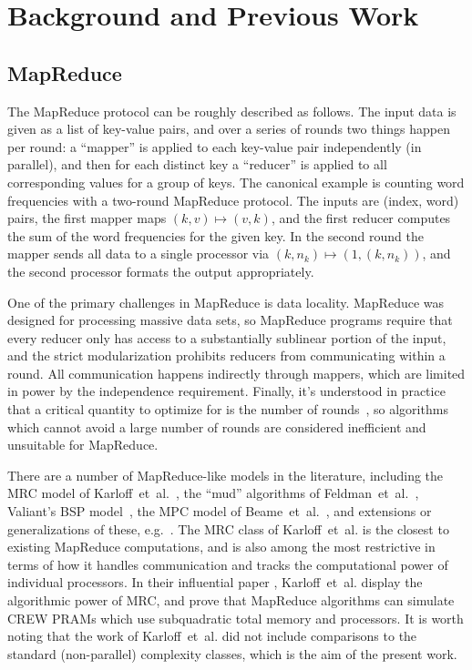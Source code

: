 \section{Background and Previous Work}

\subsection{MapReduce}

The MapReduce protocol can be roughly described as follows. The input data is
given as a list of key-value pairs, and over a series of rounds two things
happen per round: a ``mapper'' is applied to each key-value pair independently
(in parallel), and then for each distinct key a ``reducer'' is applied to all
corresponding values for a group of keys. The canonical example is counting
word frequencies with a two-round MapReduce protocol. The inputs are (index,
word) pairs, the first mapper maps $(k,v) \mapsto (v,k)$, and the first reducer
computes the sum of the word frequencies for the given key. In the second round
the mapper sends all data to a single processor via $(k, n_k) \mapsto (1, (k,
n_k))$, and the second processor formats the output appropriately.

One of the primary challenges in MapReduce is data locality. MapReduce was
designed for processing massive data sets, so MapReduce programs require that
every reducer only has access to a substantially sublinear portion of the
input, and the strict modularization prohibits reducers from communicating
within a round. All communication happens indirectly through mappers, which are
limited in power by the independence requirement. Finally, it's understood in
practice that a critical quantity to optimize for is the number of
rounds~\cite{Karloff10}, so algorithms which cannot avoid a large number of
rounds are considered inefficient and unsuitable for MapReduce.

There are a number of MapReduce-like models in the literature, including the
MRC model of Karloff~et~al.~\cite{Karloff10}, the ``mud'' algorithms of
Feldman~et~al.~\cite{FeldmanMSSS10}, Valiant's BSP model~\cite{Valiant90}, the
MPC model of Beame~et~al.~\cite{BeameKS13}, and extensions or generalizations
of these, e.g.~\cite{GoodrichSZ11}. The MRC class of Karloff~et~al. is the
closest to existing MapReduce computations, and is also among the most
restrictive in terms of how it handles communication and tracks the
computational power of individual processors. In their influential paper
\cite{Karloff10}, Karloff~et~al. display the algorithmic power of MRC, and
prove that MapReduce algorithms can simulate CREW PRAMs which use subquadratic
total memory and processors. It is worth noting that the work of Karloff~et~al.
did not include comparisons to the standard (non-parallel) complexity classes,
which is the aim of the present work.

